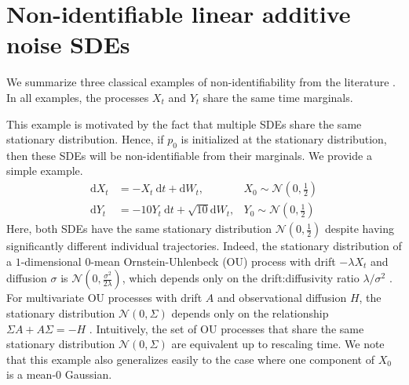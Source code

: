 \documentclass[twoside,11pt]{article}
\begin{document}
\section{Non-identifiable linear additive noise SDEs}
\label{sec:Noniden_examples}

 We summarize three classical examples of non-identifiability  from the literature \citep{lavenant2021towards, shen2024multi, wang2024generator,hashimoto2016learning,weinreb2018fundamental}. In all examples, the processes $X_t$ and $Y_t$ share the same time marginals.

\begin{ex}
\label{eq: non_identifiability_same_stationary}
This example is motivated by the fact that multiple SDEs share the same stationary distribution. Hence, if $p_0$ is initialized at the stationary distribution, then these SDEs will be non-identifiable from their marginals. We provide a simple example.
\begin{align}
    \mathrm{d}X_t &= -X_t \: \mathrm{d}t+ \mathrm{d}W_t, &  X_0 \sim \mathcal{N}(0, \frac{1}{2})\\
    \mathrm{d}Y_t &= -10Y_t \: \mathrm{d}t+ \sqrt{10}\mathrm{d}W_t, & Y_0 \sim \mathcal{N}(0, \frac{1}{2})
\end{align}
Here, both SDEs have the same stationary distribution $\mathcal{N}(0, \frac{1}{2})$ despite having significantly different individual trajectories. Indeed, the stationary distribution of a $1$-dimensional $0$-mean Ornstein-Uhlenbeck (OU) process with drift $-\lambda X_t$ and diffusion $\sigma$ is  $\mathcal{N}(0, \frac{\sigma^2}{2\lambda})$, which depends only on the drift:diffusivity ratio $\lambda/\sigma^2$ \citep{lavenant2021towards}. For multivariate OU processes with drift $A$ and observational diffusion $H$, the stationary distribution $\mathcal{N}(0, \Sigma)$ depends only on the relationship $\Sigma A + A \Sigma = -H$ \citep{mandt2016variational}. Intuitively, the set of OU processes that share the same stationary distribution $\mathcal{N}(0, \Sigma)$ are equivalent up to rescaling time. We note that this example also generalizes easily to the case where one component of $X_0$ is a mean-$0$ Gaussian. 
\end{ex}

\end{document}
